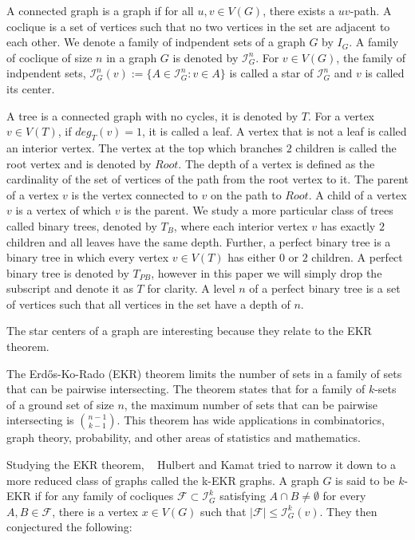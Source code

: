 \documentclass{amsart}
\theoremstyle{definition}
\begin{document}
A connected graph is a graph if for all $u,v \in V(G)$, there exists a $uv$-path. A coclique is a set of vertices such that no two vertices in the set are adjacent to each other. We denote a family of indpendent sets of a graph $G$ by $I_G$. A family of coclique of size $n$ in a graph $G$ is denoted by $\mathcal{I}^n_G$. For $v \in V(G)$, the family of indpendent sets, $\mathcal{I}^n_G(v) := \{A \in \mathcal{I}^n_G : v \in A\}$ is called a star of $\mathcal{I}^n_G$ and $v$ is called its center.

A tree is a connected graph with no cycles, it is denoted by $T$. For a vertex $v \in V(T)$, if $deg_T(v) = 1$, it is called a leaf. A vertex that is not a leaf is called an interior vertex. The vertex at the top which branches $2$ children is called the root vertex and is denoted by $Root$. The depth of a vertex is defined as the cardinality of the set of vertices of the path from the root vertex to it. The parent of a vertex $v$ is the vertex connected to $v$ on the path to $Root$. A child of a vertex $v$ is a vertex of which $v$ is the parent. We study a more particular class of trees called binary trees, denoted by $T_B$, where each interior vertex $v$ has exactly $2$ children and all leaves have the same depth. Further, a perfect binary tree is a binary tree in which every vertex $v \in V(T)$ has either $0$ or $2$ children. A perfect binary tree is denoted by $T_{PB}$, however in this paper we will simply drop the subscript and denote it as $T$ for clarity. A level $n$ of a perfect binary tree is a set of vertices such that all vertices in the set have a depth of $n$.

The star centers of a graph are interesting because they relate to the EKR theorem. 


The Erd\H{o}s-Ko-Rado (EKR) theorem limits the number of sets in a family of sets that can be pairwise intersecting. The theorem states that for a family of $k$-sets of a ground set of size $n$, the maximum number of sets that can be pairwise intersecting is $\binom{n-1}{k-1}$. This theorem has wide applications in combinatorics, graph theory, probability, and other areas of statistics and mathematics.

Studying the EKR theorem, ~\cite{MR2763040} Hulbert and Kamat tried to narrow it down to a more reduced class of graphs called the k-EKR graphs. A graph $G$ is said to be $k$-EKR if for any family of cocliques $\mathcal{F} \subset \mathcal{I}^k_G$ satisfying $A \cap B \neq \emptyset$ for every $A, B \in \mathcal{F}$, there is a vertex $x \in V(G)$ such that $|\mathcal{F}| \leq \mathcal{I}^k_G(v)$. They then conjectured the following:
\end{document}
